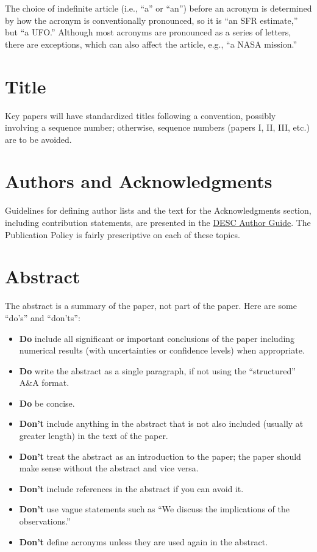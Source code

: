 \documentclass[letterpaper,11pt]{article}
\begin{document}
The choice of indefinite article (i.e., ``a'' or ``an'') before an
acronym is determined by how the acronym is conventionally pronounced,
so it is ``an SFR estimate,'' but ``a UFO.''  Although most acronyms are
pronounced as a series of letters, there are exceptions, which can also affect
the article, e.g., ``a NASA mission.''

\section{Title}

Key papers will have standardized titles following a  convention, possibly involving a sequence number; otherwise, sequence numbers (papers I, II, III, etc.) are to be avoided.

\section{Authors and Acknowledgments}

Guidelines for defining author lists and the text for the Acknowledgments section, including contribution statements, are presented in the \href{https://github.com/LSSTDESC/Author_Guide/blob/compiled/main.pdf}{DESC Author Guide}.  The Publication Policy is fairly prescriptive on each of these topics.

\section{Abstract}

The abstract is a summary of the paper, not part of the paper. Here are some ``do's'' and ``don'ts'': 
\begin{itemize}
\item {\bf Do} include all significant or important conclusions of the paper including numerical results (with uncertainties or confidence levels) when appropriate.
\item {\bf Do} write the abstract as a single paragraph, if not using the ``structured'' A\&A format.  
\item {\bf Do} be concise.
\item {\bf Don't} include anything in the abstract that is not also included (usually at greater length) in the text of the paper.
\item {\bf Don't} treat the abstract as an introduction to the paper; the paper should make sense without the abstract and vice versa.
\item {\bf Don't} include references in the abstract if you can avoid it.
\item {\bf Don't} use vague statements such as ``We discuss the implications of the observations.''
\item {\bf Don't} define acronyms unless they are used again in the abstract. 
\end{itemize}
\end{document}
